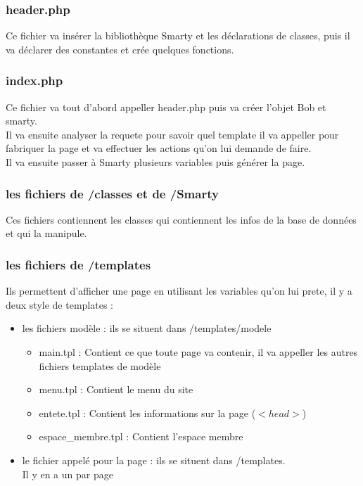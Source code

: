 \subsubsection{header.php}
	Ce fichier va insérer la bibliothèque Smarty et les déclarations de classes, puis il va déclarer des constantes et crée quelques fonctions.
	
\subsubsection{index.php}
	Ce fichier va tout d'abord appeller header.php puis va créer l'objet Bob et smarty.\\
	Il va ensuite analyser la requete pour savoir quel template il va appeller pour fabriquer la page et va effectuer les actions qu'on lui demande de faire.\\
	Il va ensuite passer à Smarty plusieurs variables puis générer la page.

\subsubsection{les fichiers de /classes et de /Smarty}
	Ces fichiers contiennent les classes qui contiennent les infos de la base de données et qui la manipule.
	
\subsubsection{les fichiers de /templates}
	Ils permettent d'afficher une page en utilisant les variables qu'on lui prete, il y a deux style de templates : 	
\begin{itemize}
	\item les fichiers modèle : ils se situent dans /templates/modele
	\begin{itemize}
		\item main.tpl : Contient ce que toute page va contenir, il va appeller les autres fichiers templates de modèle
		\item menu.tpl : Contient le menu du site
		\item entete.tpl  : Contient les informations sur la page ($<head>$)
		\item espace\_membre.tpl : Contient l'espace membre\\
	\end{itemize}
					
	\item le fichier appelé pour la page : ils se situent dans /templates.\\
	Il y en a un par page
	\end{itemize}
	
